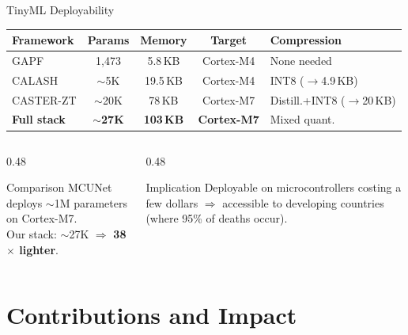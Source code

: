 \documentclass[10pt,aspectratio=169]{beamer}
\begin{document}
\begin{frame}[shrink=5]{TinyML Deployability}
\centering
\renewcommand{\arraystretch}{1.2}
\begin{tabular}{lcccl}
  \toprule
  \textbf{Framework} & \textbf{Params} & \textbf{Memory} & \textbf{Target} & \textbf{Compression} \\
  \midrule
  GAPF & 1,473 & 5.8\,KB & Cortex-M4 & None needed \\
  CALASH & $\sim$5K & 19.5\,KB & Cortex-M4 & INT8 ($\to$4.9\,KB) \\
  CASTER-ZT & $\sim$20K & 78\,KB & Cortex-M7 & Distill.+INT8 ($\to$20\,KB) \\
  \midrule
  \textbf{Full stack} & $\sim$\textbf{27K} & \textbf{103\,KB} & \textbf{Cortex-M7} & Mixed quant. \\
  \bottomrule
\end{tabular}

\vspace{10pt}
\begin{columns}[T]
\begin{column}{0.48\textwidth}
  \begin{exampleblock}{Comparison}
    \small MCUNet deploys $\sim$1M parameters on Cortex-M7.\\
    Our stack: $\sim$27K $\Rightarrow$ \textbf{38$\times$ lighter}.
  \end{exampleblock}
\end{column}
\begin{column}{0.48\textwidth}
  \begin{block}{Implication}
    \small Deployable on microcontrollers costing a few dollars $\Rightarrow$ accessible to developing countries (where 95\% of deaths occur).
  \end{block}
\end{column}
\end{columns}
\end{frame}

\section{Contributions and Impact}
\end{document}
